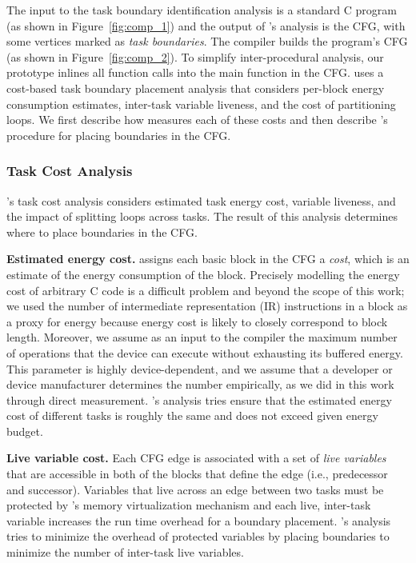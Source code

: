 The input to the task boundary identification analysis is a standard C program (as shown in Figure~\ref{fig:comp_1}) and the output of \sys's analysis is the CFG, with some vertices marked as {\em task boundaries}. The \sys compiler builds the program's CFG (as shown in
Figure~\ref{fig:comp_2}). To simplify inter-procedural analysis, our prototype inlines all function calls into the main function in the CFG. \sys uses a cost-based task boundary placement analysis that considers per-block energy consumption estimates, inter-task variable liveness, and the cost of partitioning loops. We first describe how \sys measures each of these costs and then describe \sys's procedure for placing boundaries in the CFG.

\subsubsection{Task Cost Analysis}

\sys's task cost analysis considers estimated task energy cost, variable liveness, and the impact of splitting loops across tasks. The result of this analysis determines where to place boundaries in the CFG.
 
{\noindent \bf Estimated energy cost.} \sys assigns each basic block in the CFG a {\em cost}, which is an estimate of the energy consumption of the block. Precisely modelling the energy cost of arbitrary C code is a difficult problem and beyond the scope of this work; we used the number of intermediate representation (IR) instructions in a block as a proxy for energy because energy cost is likely to closely correspond to block length. Moreover, we
assume as an input to the compiler the maximum number of operations that the device can execute without exhausting its buffered energy. This parameter is highly device-dependent, and we assume that a developer or device manufacturer determines the number empirically, as we did in this work through direct measurement. \sys's analysis tries ensure that the estimated energy cost of different tasks is roughly the same and does not exceed given energy budget. 

{\noindent \bf Live variable cost.} Each CFG edge is associated with a set of {\em live variables} that are accessible in both of the blocks that define the edge (i.e., predecessor and successor). Variables that live across an edge between two tasks must be protected by \sys's memory virtualization mechanism and each live, inter-task variable increases the run time overhead for a boundary placement. \sys's analysis tries to minimize the overhead of protected variables by placing boundaries to minimize the number of inter-task live variables.

